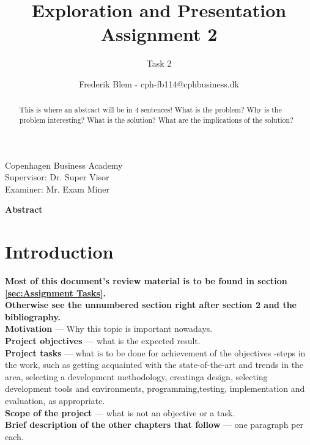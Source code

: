 \documentclass[
english, %
headsepline, %
]{scrartcl} %
\begin{document}
\begin{titlepage}
\title{Exploration and Presentation Assignment 2}
\author{Frederik Blem - cph-fb114@cphbusiness.dk}
\subtitle{Task 2}
\maketitle
\begin{center}
    \large
        Copenhagen Business Academy\\
        Supervisor: Dr. Super Visor\\
        Examiner: Mr. Exam Miner
\end{center}

\thispagestyle{empty}

\end{titlepage}
\clearpage

\Large
    \textbf{Abstract}
    \begin{abstract}
        \label{sec:abstract}
        This is where an abstract will be in 4 sentences! What is the problem? Why is the problem interesting? What is the solution? 
        What are the implications of the solution?
    \end{abstract}
\normalsize  
\clearpage

\section{Introduction}
\label{sec:introduction} %
    \textbf{Most of this document's review material is to be found in section \ref{sec:Assignment Tasks}.
    \\    
    Otherwise see the unnumbered section right after section 2 and the bibliography.}\\ 
    \textbf{Motivation} — Why this topic is important nowadays.\\
    \textbf{Project objectives} — what is the expected result.\\
    \textbf{Project tasks} — what is to be done for achievement of the objectives -steps  in  the  work, 
        such  as  getting  acquainted  with  the  state-of-the-art and  trends  in  the  area,  
        selecting  a  development  methodology,  creatinga  design,  selecting  development  tools  and  environments,  
        programming,testing, implementation and evaluation, as appropriate.\\
    \textbf{Scope of the project} — what is not an objective or a task.\\
    \textbf{Brief description of the other chapters that follow} — one paragraph per each.
\clearpage
\end{document}
